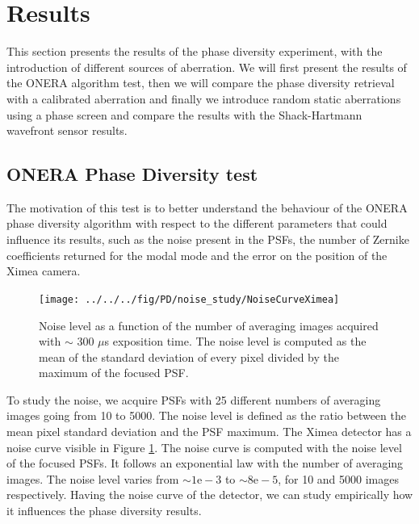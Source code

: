 \section{Results}
\label{sec:Results}

This section presents the results of the phase diversity experiment, with the introduction of different sources of aberration. We will first present the results of the ONERA algorithm test, then we will compare the phase diversity retrieval with a calibrated aberration and finally we introduce random static aberrations using a phase screen and compare the results with the Shack-Hartmann wavefront sensor results.

\subsection{ONERA Phase Diversity test}
\label{subsec:ONERAPDtest}

The motivation of this test is to better understand the behaviour of the ONERA phase diversity algorithm with respect to the different parameters that could influence its results, such as the noise present in the PSFs, the number of Zernike coefficients returned for the modal mode and the error on the position of the Ximea camera.

\begin{figure}
\begin{center}
\texttt{[image: ../../../fig/PD/noise\_study/NoiseCurveXimea]}
\decoRule
\caption{Noise level as a function of the number of averaging images acquired with $\sim$ 300 $\mu$s exposition time. The noise level is computed as the mean of the standard deviation of every pixel divided by the maximum of the focused PSF.}
\label{fig:NoiseCurve}
\end{center}
\end{figure}

To study the noise, we acquire PSFs with 25 different numbers of averaging images going from 10 to 5000. The noise level is defined as the ratio between the mean pixel standard deviation and the PSF maximum. The Ximea detector has a noise curve visible in Figure \ref{fig:NoiseCurve}. The noise curve is computed with the noise level of the focused PSFs. It follows an exponential law with the number of averaging images. The noise level varies from $\sim 1\mathrm{e}-3$ to $\sim 8\mathrm{e}-5$, for 10 and 5000 images respectively. Having the noise curve of the detector, we can study empirically how it influences the phase diversity results. 

